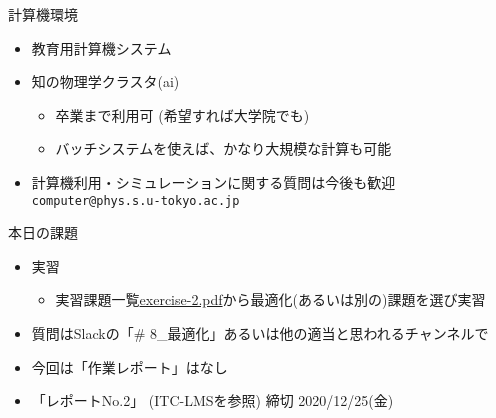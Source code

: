 \documentclass[10pt,dvipdfmx]{beamer}
\begin{document}
\begin{frame}[t,fragile]{計算機環境}
  \begin{itemize}
  \item 教育用計算機システム
  \item 知の物理学クラスタ(ai)
    \begin{itemize}
    \item 卒業まで利用可 (希望すれば大学院でも)
    \item バッチシステムを使えば、かなり大規模な計算も可能
    \end{itemize}
  \item 計算機利用・シミュレーションに関する質問は今後も歓迎 {\tt computer@phys.s.u-tokyo.ac.jp}
  \end{itemize}
\end{frame}



\begin{frame}[t]{本日の課題}
  \begin{itemize}
  \item 実習
    \begin{itemize}
    \item 実習課題一覧\href{https://github.com/todo-group/ComputerExperiments/releases/tag/2020a-computer2}{exercise-2.pdf}から最適化(あるいは別の)課題を選び実習
    \end{itemize}
  \item 質問はSlackの「\# 8\_最適化」あるいは他の適当と思われるチャンネルで
  \item 今回は「作業レポート」はなし
  \item 「レポートNo.2」 (ITC-LMSを参照) 締切 2020/12/25(金)
  \end{itemize}
\end{frame}
\end{document}
